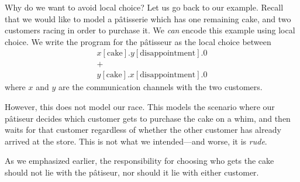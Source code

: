 \documentclass[10pt,a4paper,twocolumn,notitlepage]{article}
\begin{document}
Why do we want to avoid local choice? Let us go back to our example.
Recall that we would like to model a p\^{a}tisserie which has one remaining
cake, and two customers racing in order to purchase it.
We \emph{can} encode this example using local choice.
We write the program for the p\^{a}tisseur as the local choice between
\begin{gather*}
  x[\text{cake}].y[\text{disappointment}].0 \\
  + \\
  y[\text{cake}].x[\text{disappointment}].0
\end{gather*}
where $x$ and $y$ are the communication channels with the two customers. 

However, this does not model our race.
This models the scenario where our p\^{a}tiseur decides which customer
gets to purchase the cake on a whim, and then waits for that customer
regardless of whether the other customer has already arrived at the store.
This is not what we intended---and worse, it is \emph{rude}.

As we emphasized earlier, the responsibility for choosing who gets the cake
should not lie with the p\^{a}tiseur, nor should it lie with either customer.
\end{document}

